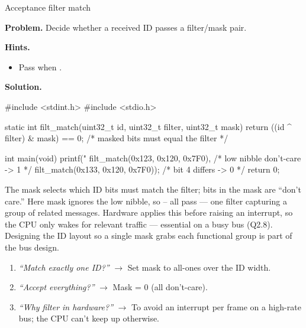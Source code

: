 \begin{gymproblem}{Acceptance filter match}

\textbf{Problem.} Decide whether a received ID passes a filter/mask pair.

\textbf{Hints.}
\begin{itemize}
\item Pass when .
\end{itemize}

\attempt

\textbf{Solution.}
\begin{cgym}
#include <stdint.h>
#include <stdio.h>

static int filt_match(uint32_t id, uint32_t filter, uint32_t mask) {
    return ((id ^ filter) & mask) == 0;   /* masked bits must equal the filter */
}

int main(void) {
    printf("%
           filt_match(0x123, 0x120, 0x7F0),   /* low nibble don't-care -> 1 */
           filt_match(0x133, 0x120, 0x7F0));  /* bit 4 differs -> 0 */
    return 0;
}
\end{cgym}

The mask selects which ID bits must match the filter;  bits in the mask
are ``don't care.'' Here mask  ignores the low nibble, so 
-- all pass --- one filter capturing a group of related messages.
Hardware applies this before raising an interrupt, so the CPU only wakes for
relevant traffic --- essential on a busy bus (Q2.8). Designing the ID layout so a
single mask grabs each functional group is part of the bus design.

\followups
\begin{enumerate}
\item \emph{``Match exactly one ID?''} $\rightarrow$ Set mask to all-ones over
  the ID width.
\item \emph{``Accept everything?''} $\rightarrow$ Mask = 0 (all don't-care).
\item \emph{``Why filter in hardware?''} $\rightarrow$ To avoid an interrupt per
  frame on a high-rate bus; the CPU can't keep up otherwise.
\end{enumerate}
\end{gymproblem}

